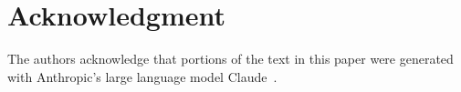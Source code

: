 \documentclass[conference]{IEEEtran}
\begin{document}







\section*{Acknowledgment}
The authors acknowledge that portions of the text in
this paper were generated with Anthropic's large language
model Claude~\cite{claude2025}.

\newpage



\clearpage
\appendices

\end{document}
